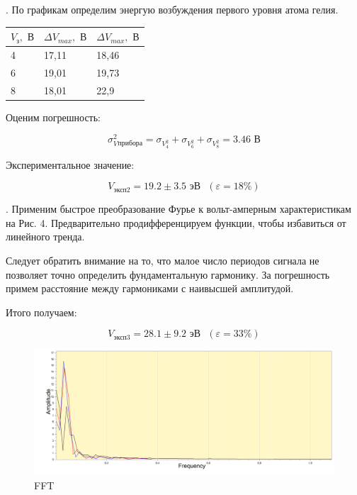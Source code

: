 \documentclass[a4paper,12pt]{article} %
\begin{document}
\medskip

. По графикам определим энергую возбуждения первого уровня атома гелия.

\medskip

\begin{table}[h!]
\begin{tabular}{|l|l|l|}
\hline
$V_\text{з}, \text{ В}$ & $\Delta V_{max}, \text{ В}$ & $\Delta V_{max}, \text{ В}$ \\ \hline
4            & 17,11            & 18,46            \\ \hline
6            & 19,01            & 19,73            \\ \hline
8            & 18,01            & 22,9             \\ \hline
\end{tabular}
\end{table}

\medskip

\noindent Оценим погрешность:

    $$\sigma_V^2_{\text{прибора}} = \sigma_V_4^2 + \sigma_V_6^2 + \sigma_V_8^2 = 3.46 \text{ В} $$  
    
\noindent Экспериментальное значение:

    $$V_{\text{эксп2}} = 19.2 \pm 3.5 \text{ эВ} \text{ }(\varepsilon = 18 \%)$$ 


\medskip

. Применим быстрое преобразование Фурье к вольт-амперным характеристикам на Рис. 4. Предварительно продифференцируем функции, чтобы избавиться от линейного тренда.

\medskip

\noindent Следует обратить внимание на то, что малое число периодов сигнала не позволяет точно определить фундаментальную гармонику. За погрешность примем расстояние между гармониками с наивысшей амплитудой.

\medskip

\noindent Итого получаем:

    $$V_{\text{эксп3}} = 28.1 \pm 9.2 \text{ эВ} \text{ }(\varepsilon = 33 \%)$$ 

\begin{figure}[h!]
    \centering
    \includegraphics[scale=0.85]{FFT.png}
    \caption{FFT}
    
\end{figure}
\end{document}
